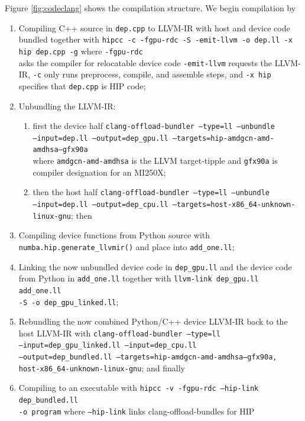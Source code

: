Figure \ref{fig:codeclang} shows the compilation structure.
We begin compilation by
\begin{enumerate}
    \item Compiling C++ source in \texttt{dep.cpp} to LLVM-IR with host and device code bundled together with \texttt{hipcc -c -fgpu-rdc -S -emit-llvm -o dep.ll -x hip dep.cpp -g} where \texttt{-fgpu-rdc} \\ asks the compiler for relocatable device code \texttt{-emit-llvm} requests the LLVM-IR, \texttt{-c} only runs preprocess, compile, and assemble steps, and \texttt{-x hip} specifies that \texttt{dep.cpp} is HIP code;
    
    \item Unbundling the LLVM-IR:
    
    \begin{enumerate}
        \item first the device half \texttt{clang-offload-bundler --type=ll --unbundle \\--input=dep.ll --output=dep\_gpu.ll --targets=hip-amdgcn-amd-amdhsa--gfx90a} \\ where \texttt{amdgcn-amd-amdhsa} is the LLVM target-tipple and \texttt{gfx90a} is compiler designation for an MI250X;
        
        \item then the host half \texttt{clang-offload-bundler --type=ll --unbundle \\--input=dep.ll --output=dep\_cpu.ll --targets=host-x86\_64-unknown-linux-gnu}; then
    \end{enumerate}
    
    \item Compiling device functions from Python source with \texttt{numba.hip.generate\_llvmir()} and place into \texttt{add\_one.ll};
    
    \item Linking the now unbundled device code in \texttt{dep\_gpu.ll} and the device code from Python in \texttt{add\_one.ll} together with \texttt{llvm-link dep\_gpu.ll add\_one.ll \\-S -o dep\_gpu\_linked.ll};
    
    \item Rebundling the now combined Python/C++ device LLVM-IR back to the host LLVM-IR with \texttt{clang-offload-bundler --type=ll \\--input=dep\_gpu\_linked.ll --input=dep\_cpu.ll \\--output=dep\_bundled.ll --targets=hip-amdgcn-amd-amdhsa--gfx90a,\\host-x86\_64-unknown-linux-gnu}; and finally
    
    \item Compiling to an executable with \texttt{hipcc -v -fgpu-rdc --hip-link dep\_bundled.ll\\-o program} where \texttt{--hip-link} links clang-offload-bundles for HIP
    
\end{enumerate}

